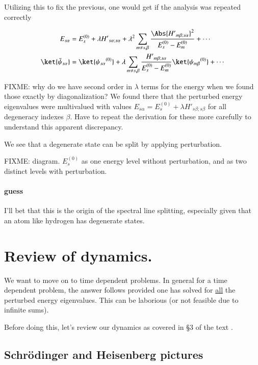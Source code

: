 Utilizing this to fix the previous, one would get if the analysis was repeated correctly

\begin{align}\label{eqn:qmTwoL5:190}
E_{s\alpha} &= E_s^{(0)} + \lambda {H'}_{s\alpha ; s\alpha} 
+ \lambda^2 
\sum_{m \ne s, \beta} 
\frac{\Abs{{H'}_{m \beta ; s \alpha}}^2 }
{ E_s^{(0)} - E_m^{(0)} } 
+ \cdots
\\
\ket{\bar{\psi}_{s \alpha}} &= \ket{{\psi_{s \alpha}}^{(0)}} 
+ \lambda
\sum_{m \ne s, \beta} 
\frac{{H'}_{m \beta ; s \alpha}}
{ E_s^{(0)} - E_m^{(0)} } \ket{{\psi_{m \beta}}^{(0)}}
+ \cdots
\end{align}

FIXME: why do we have second order in $\lambda$ terms for the energy when we found those exactly by diagonalization?  We found there that the perturbed energy eigenvalues were multivalued with values $E_{s\alpha} = E_s^{(0)} + \lambda {H'}_{s\beta ; s\beta}$ for all degeneracy indexes $\beta$.  Have to repeat the derivation for these more carefully to understand this apparent discrepancy.

We see that a degenerate state can be split by applying perturbation.

FIXME: diagram.  $E_s^{(0)}$ as one energy level without perturbation, and as two distinct levels with perturbation.

\paragraph{guess} I'll bet that this is the origin of the spectral line splitting, especially given that an atom like hydrogen has degenerate states.

\section{Review of dynamics.}

We want to move on to time dependent problems.  In general for a time dependent problem, the answer follows provided one has solved for \underline{all} the perturbed energy eigenvalues.  This can be laborious (or not feasible due to infinite sums).

Before doing this, let's review our dynamics as covered in \S 3 of the text \cite{desai2009quantum}.

\subsection{Schr\"{o}dinger and Heisenberg pictures}

